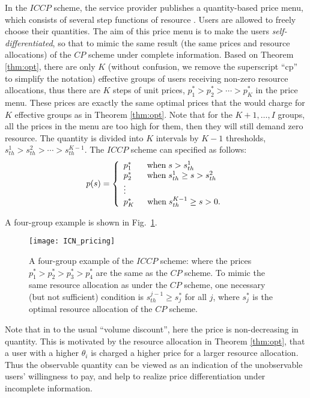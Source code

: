 \documentclass[twocolumn,10pt,twosided]{IEEEtran}
\begin{document}
In the $ICCP$ scheme, the service provider publishes a quantity-based price menu, which consists of several step functions of resource . Users are allowed to freely choose their quantities. The aim of this price menu is to make the users \emph{self-differentiated}, so that to mimic the same result (the same prices and resource allocations) of the $CP$ scheme under complete information.
Based on Theorem \ref{thm:opt}, there are only $K$ (without confusion, we remove the superscript ``cp'' to simplify the notation) effective groups of users receiving non-zero resource allocations, thus there are $K$ steps of unit prices, $p^*_{1}>p^*_{2}>\cdots
>p^*_{K}$ in the price menu. These prices are exactly the same optimal prices that the  would charge for $K$ effective groups as in Theorem \ref{thm:opt}. Note that for the $K+1,\dots,I$ groups, all the prices in the menu are too high for them, then they will still demand zero resource.
The quantity is divided into $K$ intervals by $K-1$ thresholds, $s_{th}^{1}>s_{th}^{2}>\cdots>s_{th}^{K-1}$. The $ICCP$ scheme can specified as
follows:
\begin{equation}
p(s)= \left\{ {\begin{array}{ll}
   {p^*_{1}\quad\;\;\; {\rm{when}}\; s > s^1_{th}   }\\
   {p^*_2\quad\;\;\; {\rm{when}}\;  s^1_{th}  \ge s > s^2_{th}  } \\
    \vdots   \\
{p^*_{K}\;\;\quad {\rm{when}}\; s^{K-1}_{th}  \ge s > 0.  }\\
\end{array} }\right.
\label{IC_P}
\end{equation}

A four-group example is shown in Fig.~\ref{fig:IC_pricing}.
\begin{figure}[ht]
\centering
\texttt{[image: ICN\_pricing]}
\caption{A four-group example of the $ICCP$ scheme: where the prices
$p^*_1>p^*_2>p^*_3>p^*_{4}$ are the same as the $CP$ scheme. To mimic the same resource
allocation as under the $CP$ scheme, one necessary  (but not sufficient) condition is $s^{j-1}_{th}\ge s^*_{j}$ for all $j$, where $s^*_j$ is
the optimal resource allocation of the $CP$ scheme.}
\label{fig:IC_pricing}
\end{figure}

Note that in  to the usual ``volume discount'', here the price is non-decreasing in quantity. This is motivated by the resource allocation in Theorem \ref{thm:opt}, that a user with a higher $\theta_{i}$ is charged a higher price for a larger resource allocation. Thus the observable quantity can be viewed as an indication of the unobservable users' willingness to pay, and help to realize price differentiation under incomplete information.
\end{document}
